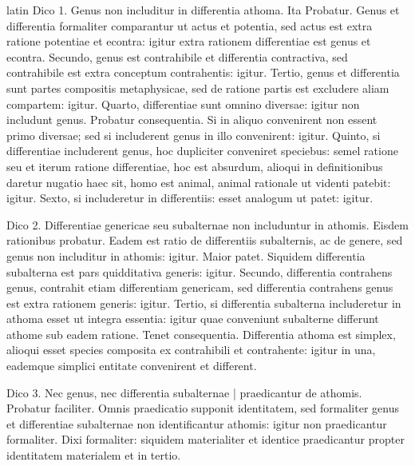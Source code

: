 \begin{otherlanguage*}{latin}
\pstart
Dico 1. Genus non includitur in differentia athoma. Ita  Probatur. Genus et differentia formaliter comparantur ut actus et potentia, sed actus est extra ratione potentiae et econtra:
igitur extra rationem differentiae est genus et econtra. Secundo, genus est contrahibile et differentia contractiva, sed contrahibile est extra conceptum contrahentis:
igitur. Tertio, genus et differentia sunt partes compositis metaphysicae, sed de ratione partis est excludere aliam compartem:
igitur. Quarto, differentiae sunt omnino diversae:
igitur non includunt genus. Probatur consequentia. Si in aliquo convenirent non essent primo diversae; sed si includerent genus in illo convenirent:
igitur. Quinto, si differentiae includerent genus, hoc dupliciter conveniret speciebus:
semel ratione seu et iterum ratione differentiae, hoc est absurdum, alioqui in definitionibus daretur nugatio haec sit, homo est animal, animal rationale ut videnti patebit:
igitur. Sexto, si includeretur in differentiis:
esset analogum ut patet:
igitur. 
\pend

\pstart
Dico 2. Differentiae genericae seu subalternae non includuntur in athomis. Eisdem rationibus probatur. Eadem est ratio de differentiis subalternis, ac de genere, sed genus non includitur in athomis:
igitur. Maior patet. Siquidem differentia subalterna est pars quidditativa generis:
igitur. Secundo, differentia contrahens genus, contrahit etiam differentiam genericam, sed differentia contrahens genus est extra rationem generis:
igitur. Tertio, si differentia subalterna includeretur in athoma esset ut integra essentia:
igitur quae conveniunt subalterne differunt athome sub eadem ratione. Tenet consequentia. Differentia athoma est simplex, alioqui esset species composita ex contrahibili et contrahente:
igitur in una, eademque simplici entitate convenirent et different. 
\pend

\pstart
Dico 3. Nec genus, nec differentia subalternae \textnormal{|} praedicantur de athomis. Probatur faciliter. Omnis praedicatio supponit identitatem, sed formaliter genus et differentiae subalternae non identificantur athomis:
igitur non praedicantur formaliter. Dixi formaliter:
siquidem materialiter et identice praedicantur propter identitatem materialem et in tertio. 
\pend


\end{otherlanguage*}
